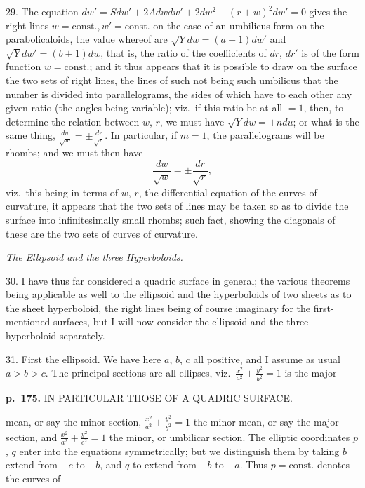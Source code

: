 \documentclass[11pt,a4paper]{article}
\begin{document}
29.  The equation $dw' = Sdw' + 2Adwdw' + 2dw^2 - (r + w)^2 dw' = 0$ gives the right lines $w = \mathrm{const.}, w' = \mathrm{const.}$ on the case of an umbilicus form on the parabolicaloids, the value whereof are $\sqrt{Y} dw = (a + 1) dw'$ and $\sqrt{Y} dw' = (b + 1) dw$, that is, the ratio of the coefficients of $dr$, $dr'$ is of the form function $w = \mathrm{const.}$; and it thus appears that it is possible to draw on the surface the two sets of right lines, the lines of such not being such umbilicus that the number is divided into parallelograms, the sides of which have to each other any given ratio (the angles being variable); viz.\ if this ratio be at all $= 1$, then, to determine the relation between $w$, $r$, we must have $\sqrt{Y} dw = \pm n du$; or what is the same thing, $\frac{dw}{\sqrt{w}} = \pm \frac{dr}{\sqrt{r}}$. In particular, if $m = 1$, the parallelograms will be rhombs; and we must then have
\[
\frac{dw}{\sqrt{w}} = \pm \frac{dr}{\sqrt{r}},
\]
viz.\ this being in terms of $w$, $r$, the differential equation of the curves of curvature,
it appears that the two sets of lines may be taken so as to divide the surface into
infinitesimally small rhombs; such fact, showing the diagonals of these are the two
sets of curves of curvature.

\textit{The Ellipsoid and the three Hyperboloids.}

30. I have thus far considered a quadric surface in general; the various theorems
being applicable as well to the ellipsoid and the hyperboloids of two sheets as to the
sheet hyperboloid, the right lines being of course imaginary for the first-mentioned
surfaces, but I will now consider the ellipsoid and the three hyperboloid separately.

31. First the ellipsoid.  We have here $a$, $b$, $c$ all positive, and I assume as usual
$a > b > c$.  The principal sections are all ellipses, viz.\ $\frac{x^2}{a^2} + \frac{y^2}{b^2} = 1$ is the major-

\clearpage

\noindent
\textbf{p.~175.}  IN PARTICULAR THOSE OF A QUADRIC SURFACE.

mean, or say the minor section, $\frac{x^2}{a^2} + \frac{y^2}{b^2} = 1$ the minor-mean, or say the major section, and $\frac{x^2}{a^2} + \frac{y^2}{c^2} = 1$ the minor, or umbilicar section. The elliptic coordinates $p$, $q$ enter into the equations symmetrically; but we distinguish them by taking $b$ extend from $-c$ to $-b$, and $q$ to extend from $-b$ to $-a$.  Thus $p = \mathrm{const.}$ denotes the curves of
\end{document}

